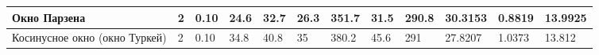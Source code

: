 {\begin{longtable}{|L{3.35cm}|C{0.65cm}|C{0.85cm}|C{1.10cm}|C{1.10cm}|C{1.30cm}|C{0.95cm}|C{0.95cm}|C{1.10cm}|C{1.45cm}|C{1.35cm}|C{1.40cm}|}
\hline
Окно Парзена & %
2 & %
0.10 & %
24.6 & %
32.7 & %
26.3 & %
351.7 & %
31.5 & %
290.8 & %
30.3153 & %
0.8819 & %
13.9925 \\
\hline
Косинусное окно (окно Туркей) & %
2 & %
0.10 & %
34.8 & %
40.8 & %
35 & %
380.2 & %
45.6 & %
291 & %
27.8207 & %
1.0373 & %
13.812 \\
\hline
\end{longtable}
}
